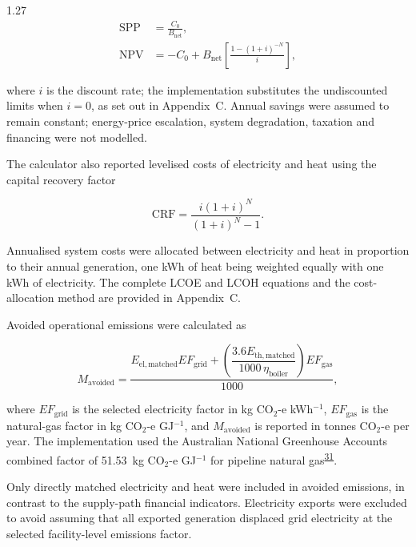 \documentclass[12pt,letterpaper]{article}
\DeclareRobustCommand{\citenum}[1]{\hyperlink{ref:#1}{#1}} %
\begin{document}
\begin{spacing}{1.27}
\begin{align}
\mathrm{SPP} &= \frac{C_0}{B_{\mathrm{net}}}, \label{eq:spp}\\
\mathrm{NPV} &= -C_0 + B_{\mathrm{net}}\left[\frac{1-(1+i)^{-N}}{i}\right], \label{eq:npv}
\end{align}

\noindent where $i$ is the discount rate; the implementation substitutes the undiscounted limits when $i=0$, as set out in Appendix~C. Annual savings were assumed to remain constant; energy-price escalation, system degradation, taxation and financing were not modelled.\par

\vspace{0.15in}

The calculator also reported levelised costs of electricity and heat using the capital recovery factor

\begin{equation}
\mathrm{CRF} = \frac{i(1+i)^N}{(1+i)^N-1}.
\label{eq:crf}
\end{equation}

Annualised system costs were allocated between electricity and heat in proportion to their annual generation, one kWh of heat being weighted equally with one kWh of electricity. The complete LCOE and LCOH equations and the cost-allocation method are provided in Appendix~C.\par

\vspace{0.15in}

Avoided operational emissions were calculated as

\begin{equation}
M_{\mathrm{avoided}} = \frac{E_{\mathrm{el,matched}}EF_{\mathrm{grid}} + \left(\dfrac{3.6E_{\mathrm{th,matched}}}{1000\,\eta_{\mathrm{boiler}}}\right)EF_{\mathrm{gas}}}{1000},
\label{eq:emissions}
\end{equation}

\noindent where $EF_{\mathrm{grid}}$ is the selected electricity factor in kg CO$_2$-e kWh$^{-1}$, $EF_{\mathrm{gas}}$ is the natural-gas factor in kg CO$_2$-e GJ$^{-1}$, and $M_{\mathrm{avoided}}$ is reported in tonnes CO$_2$-e per year. The implementation used the Australian National Greenhouse Accounts combined factor of 51.53~kg CO$_2$-e GJ$^{-1}$ for pipeline natural gas\textsuperscript{\citenum{31}}.\par

\vspace{0.15in}

Only directly matched electricity and heat were included in avoided emissions, in contrast to the supply-path financial indicators. Electricity exports were excluded to avoid assuming that all exported generation displaced grid electricity at the selected facility-level emissions factor.\par
\end{spacing}
\end{document}
